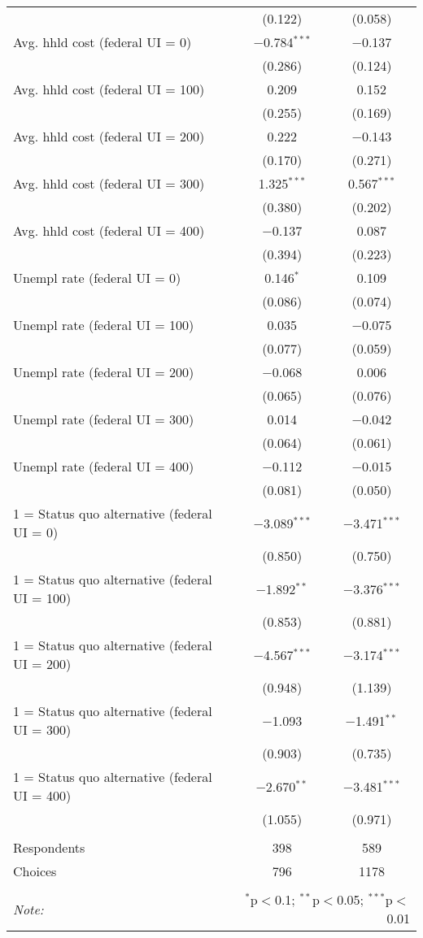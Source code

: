 \begin{table}[!htbp]
\begin{tabular}{@{\extracolsep{5pt}}lcc}
  & (0.122) & (0.058) \\ 
  Avg. hhld cost (federal UI = 0) & $-$0.784$^{***}$ & $-$0.137 \\ 
  & (0.286) & (0.124) \\ 
  Avg. hhld cost (federal UI = 100) & 0.209 & 0.152 \\ 
  & (0.255) & (0.169) \\ 
  Avg. hhld cost (federal UI = 200) & 0.222 & $-$0.143 \\ 
  & (0.170) & (0.271) \\ 
  Avg. hhld cost (federal UI = 300) & 1.325$^{***}$ & 0.567$^{***}$ \\ 
  & (0.380) & (0.202) \\ 
  Avg. hhld cost (federal UI = 400) & $-$0.137 & 0.087 \\ 
  & (0.394) & (0.223) \\ 
  Unempl rate (federal UI = 0) & 0.146$^{*}$ & 0.109 \\ 
  & (0.086) & (0.074) \\ 
  Unempl rate (federal UI = 100) & 0.035 & $-$0.075 \\ 
  & (0.077) & (0.059) \\ 
  Unempl rate (federal UI = 200) & $-$0.068 & 0.006 \\ 
  & (0.065) & (0.076) \\ 
  Unempl rate (federal UI = 300) & 0.014 & $-$0.042 \\ 
  & (0.064) & (0.061) \\ 
  Unempl rate (federal UI = 400) & $-$0.112 & $-$0.015 \\ 
  & (0.081) & (0.050) \\ 
  1 = Status quo alternative (federal UI = 0) & $-$3.089$^{***}$ & $-$3.471$^{***}$ \\ 
  & (0.850) & (0.750) \\ 
  1 = Status quo alternative (federal UI = 100) & $-$1.892$^{**}$ & $-$3.376$^{***}$ \\ 
  & (0.853) & (0.881) \\ 
  1 = Status quo alternative (federal UI = 200) & $-$4.567$^{***}$ & $-$3.174$^{***}$ \\ 
  & (0.948) & (1.139) \\ 
  1 = Status quo alternative (federal UI = 300) & $-$1.093 & $-$1.491$^{**}$ \\ 
  & (0.903) & (0.735) \\ 
  1 = Status quo alternative (federal UI = 400) & $-$2.670$^{**}$ & $-$3.481$^{***}$ \\ 
  & (1.055) & (0.971) \\ 
 \hline \\[-1.8ex] 
Respondents & 398 & 589\\ 
 Choices & 796 & 1178\\ 
\hline 
\hline \\[-1.8ex] 
\textit{Note:}  & \multicolumn{2}{r}{$^{*}$p$<$0.1; $^{**}$p$<$0.05; $^{***}$p$<$0.01} \\ 
\end{tabular} 
\end{table} 
